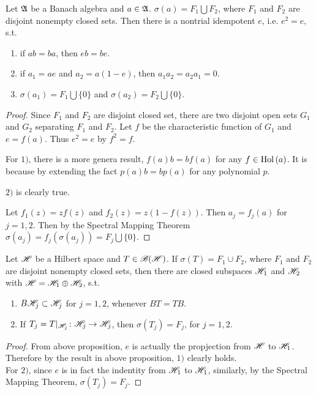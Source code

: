 \documentclass[a4paper,11pt]{report}
\begin{document}
\begin{prop} \label{prop10}
	Let $\mathfrak{A}$ be a Banach algebra and $a \in \mathfrak{A}$. $\sigma(a) = F_1 \bigcup F_2$, where $F_1$ and $F_2$ are disjoint nonempty closed sets. Then there is a nontrial idempotent $e$, i.e. $e^{2}=e$, s.t.
	\begin{enumerate}[label=\arabic*)]
		\item if $ab=ba$, then $eb=be$.
		\item if $a_1=ae$ and $a_2=a(1-e)$, then $a_1a_2=a_2a_1=0$.
		\item $\sigma(a_1)=F_1 \bigcup \{0\}$ and $\sigma(a_2)=F_2 \bigcup \{0\}$.
	\end{enumerate}
\end{prop}
\begin{proof}
	Since $F_1$ and $F_2$ are disjoint closed set, there are two disjoint open sets $G_1$ and $G_2$ separating $F_1$ and $F_2$. Let $f$ be the characteristic function of $G_1$ and $e=f(a)$. Thus $e^{2}=e$ by $f^{2}=f$.
	\item For $1)$, there is a more genera result, $f(a)b=bf(a)$ for any $f \in \operatorname{Hol}{(a)}$. It is because by extending the fact $p(a)b=bp(a)$ for any polynomial $p$.
	\item $2)$ is clearly true.
	\item Let $f_1(z)=zf(z)$ and $f_2(z)=z(1-f(z))$. Then $a_j = f_j(a)$ for $j=1,2$. Then by the Spectral Mapping Theorem $\sigma(a_j) = f_j(\sigma(a_j)) = F_j \bigcup \{0\}$.
\end{proof}

\begin{cor}
	Let $\mathscr{H}$ be a Hilbert space and $T \in \mathscr{B(H)}$. If $\sigma(T) = F_1 \cup F_2$, where $F_1$ and $F_2$ are disjoint nonempty closed sets, then there are closed subspaces $\mathscr{H}_1$ and $\mathscr{H}_2$ with $\mathscr{H} = \mathscr{H}_1 \oplus \mathscr{H}_2$, s.t.
	\begin{enumerate}[label=\arabic*)]
		\item $B\mathscr{H}_j \subset \mathscr{H}_j$ for $j=1,2$, whenever $BT=TB$.
		\item If $T_j = T|_{\mathscr{H}_j} \colon \mathscr{H}_j \rightarrow \mathscr{H}_j$, then $\sigma(T_j) = F_j$, for $j=1,2$.
	\end{enumerate}
\end{cor}
\begin{proof}
	From above proposition, $e$ is actually the propjection from $\mathscr{H}$ to $\mathscr{H}_1$. Therefore by the result in above proposition, $1)$ clearly holds.\\
	For $2)$, since $e$ is in fact the indentity from $\mathscr{H}_1$ to $\mathscr{H}_1$, similarly, by the Spectral Mapping Theorem, $\sigma(T_j) = F_j$.
\end{proof}
\end{document}
